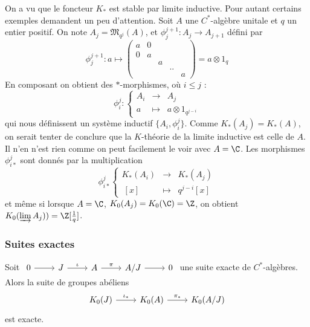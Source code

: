 On a vu que le foncteur $K_*$ est stable par limite inductive. Pour autant certains exemples demandent un peu d'attention. Soit $A$ une $C^*$-algèbre unitale et $q$ un entier positif. On note $A_j=\mathfrak M_{q^j}(A)$, et $\phi_j^{j+1}:A_j  \rightarrow  A_{j+1}$ défini par
\[\phi_j^{j+1}: 
a  \mapsto  \begin{pmatrix} a & 0 &   &  &   \\
                              0 & a &   &  &   \\
			        &   & a &  &    \\
				&   &   & ..  &   \\
				&   &   &   & a 
\end{pmatrix}=a \otimes 1_q 
\] 
En composant on obtient des $*$-morphismes, où $i\leq j$ :
\[\phi^j_i :\left\{\begin{array}{lcr}A_i & \rightarrow & A_j \\
 a &\mapsto & a\otimes 1_{q^{j-i}}\end{array}\right.\]
qui nous définissent un système inductif $\{A_i, \phi^j_i\}$. Comme $K_*(A_j)=K_*(A)$, on serait tenter de conclure que la $K$-théorie de la limite inductive est celle de $A$. Il n'en n'est rien comme on peut facilement le voir avec $A=\C$. Les morphismes $\phi_{i*}^j$ sont donnés par la multiplication 
\[\phi_{i*}^j\left\{\begin{array}{lcr} K_*(A_i) & \rightarrow & K_*(A_j)\\
			\ [x]   & \mapsto     &  q^{j-i} [x] \end{array}\right.\]
et même si lorsque $A=\C$, $K_0(A_j)=K_0(\C)=\Z$, on obtient $K_0(\varinjlim A_j))=\Z[\frac{1}{q}]$.

\subsubsection{Suites exactes}
\begin{prop}
Soit $\begin{tikzcd}0 \arrow{r}& J\arrow{r}{\iota} & A\arrow{r}{\pi} & A/J\arrow{r} & 0\end{tikzcd}$ une suite exacte de $C^*$-algèbres. Alors la suite de groupes abéliens
\[\begin{tikzcd}K_0(J)\arrow{r}{\iota_*} & K_0(A)\arrow{r}{\pi_*}& K_0(A/J)\end{tikzcd}\]
est exacte.
\end{prop}


